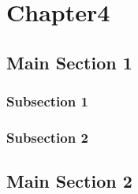 
\chapter{Chapter4}  %

\label{cha:companion-recovery}


\section{Main Section 1}



\subsection{Subsection 1}



\subsection{Subsection 2}


\section{Main Section 2}
